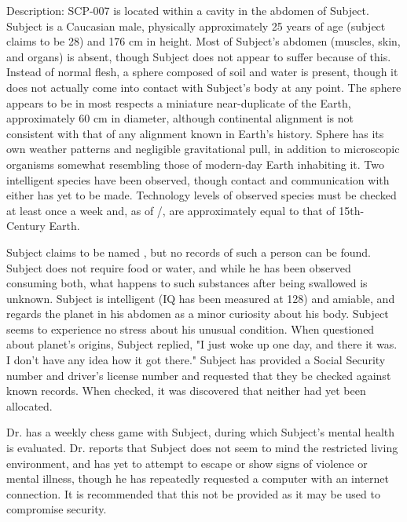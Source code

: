 \documentclass[a4paper, 11pt]{article}
\begin{document}
Description: SCP-007 is located within a cavity in the abdomen of Subject. Subject is a Caucasian male, physically approximately 25 years of age (subject claims to be 28) and 176 cm in height. Most of Subject's abdomen (muscles, skin, and organs) is absent, though Subject does not appear to suffer because of this. Instead of normal flesh, a sphere composed of soil and water is present, though it does not actually come into contact with Subject's body at any point. The sphere appears to be in most respects a miniature near-duplicate of the Earth, approximately 60 cm in diameter, although continental alignment is not consistent with that of any alignment known in Earth's history. Sphere has its own weather patterns and negligible gravitational pull, in addition to microscopic organisms somewhat resembling those of modern-day Earth inhabiting it. Two intelligent species have been observed, though contact and communication with either has yet to be made. Technology levels of observed species must be checked at least once a week and, as of /, are approximately equal to that of 15th-Century Earth.

Subject claims to be named , but no records of such a person can be found. Subject does not require food or water, and while he has been observed consuming both, what happens to such substances after being swallowed is unknown. Subject is intelligent (IQ has been measured at 128) and amiable, and regards the planet in his abdomen as a minor curiosity about his body. Subject seems to experience no stress about his unusual condition. When questioned about planet's origins, Subject replied, "I just woke up one day, and there it was. I don't have any idea how it got there." Subject has provided a Social Security number and driver's license number and requested that they be checked against known records. When checked, it was discovered that neither had yet been allocated.

Dr.  has a weekly chess game with Subject, during which Subject's mental health is evaluated. Dr.  reports that Subject does not seem to mind the restricted living environment, and has yet to attempt to escape or show signs of violence or mental illness, though he has repeatedly requested a computer with an internet connection. It is recommended that this not be provided as it may be used to compromise security.
\end{document}
